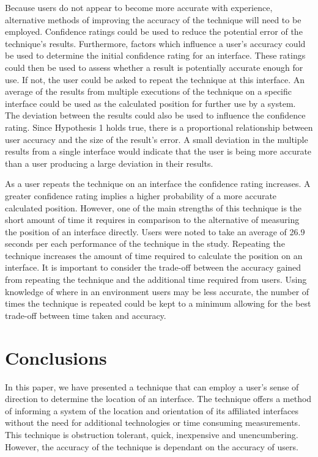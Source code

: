 \documentclass{bmcart}
\begin{document}
Because users do not appear to become more accurate with experience, alternative methods of improving the accuracy of the technique will need to be employed.
Confidence ratings could be used to reduce the potential error of the technique's results.
Furthermore, factors which influence a user's accuracy could be used to determine the initial confidence rating for an interface.
These ratings could then be used to assess whether a result is potentially accurate enough for use.
If not, the user could be asked to repeat the technique at this interface.
An average of the results from multiple executions of the technique on a specific interface could be used as the calculated position for further use by a system.
The deviation between the results could also be used to influence the confidence rating.
Since Hypothesis 1 holds true, there is a proportional relationship between user accuracy and the size of the result's error.
A small deviation in the multiple results from a single interface would indicate that the user is being more accurate than a user producing a large deviation in their results.

As a user repeats the technique on an interface the confidence rating increases.
A greater confidence rating implies a higher probability of a more accurate calculated position.
However, one of the main strengths of this technique is the short amount of time it requires in comparison to the alternative of measuring the position of an interface directly.
Users were noted to take an average of 26.9 seconds per each performance of the technique in the study.
Repeating the technique increases the amount of time required to calculate the position on an interface.
It is important to consider the trade-off between the accuracy gained from repeating the technique and the additional time required from users.
Using knowledge of where in an environment users may be less accurate, the number of times the technique is repeated could be kept to a minimum allowing for the best trade-off between time taken and accuracy.


\section*{Conclusions}\label{sec:conclusion}

In this paper, we have presented a technique that can employ a user's sense of direction to determine the location of an interface.
The technique offers a method of informing a system of the location and orientation of its affiliated interfaces without the need for additional technologies or time consuming measurements. 
This technique is obstruction tolerant, quick, inexpensive and unencumbering.
However, the accuracy of the technique is dependant on the accuracy of users.
\end{document}
